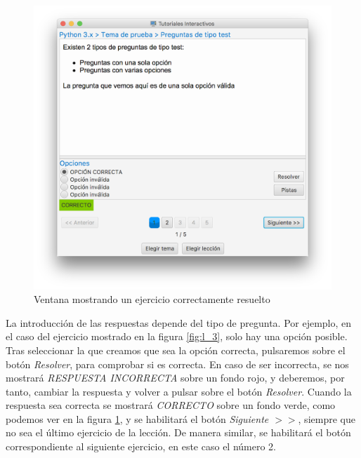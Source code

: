 \documentclass[]{article}
\begin{document}
%
\begin{figure}[tbp]
\begin{center}
\includegraphics[scale=0.35,trim={50px 70px 50px 30px},clip]{l_4.png}
\end{center}
\caption{Ventana mostrando un ejercicio correctamente resuelto\label{fig:l_4}}
\end{figure}
%


La introducción de las respuestas depende del tipo de pregunta. Por ejemplo, en el caso del ejercicio mostrado en la figura \ref{fig:l_3}, solo hay una opción posible. Tras seleccionar la que creamos que sea la opción correcta, pulsaremos sobre el botón \emph{Resolver}, para comprobar si es correcta. En caso de ser incorrecta, se nos mostrará \emph{RESPUESTA INCORRECTA} sobre un fondo rojo, y deberemos, por tanto, cambiar la respuesta y volver a pulsar sobre el botón \emph{Resolver}. Cuando la respuesta sea correcta se mostrará \emph{CORRECTO} sobre un fondo verde,  como podemos ver en la figura \ref{fig:l_4}, y se habilitará el botón \emph{Siguiente $>>$}, siempre que no sea el último ejercicio de la lección. De manera similar, se habilitará el botón correspondiente al siguiente ejercicio, en este caso el número 2. 
\end{document}
